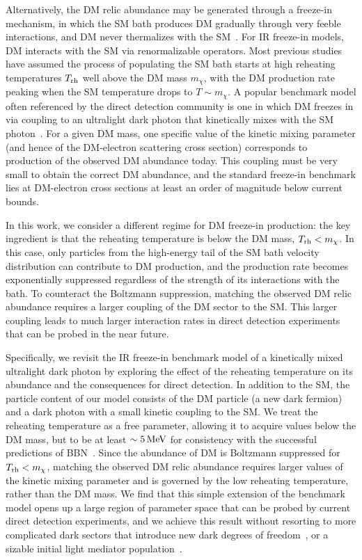 Alternatively, the DM relic abundance may be generated through a freeze-in mechanism, in which the SM bath produces DM gradually through very feeble interactions, and DM never thermalizes with the SM~\cite{Hall:2009bx}. For IR freeze-in models, DM interacts with the SM via renormalizable operators. Most previous studies have assumed the process of populating the SM bath starts at high reheating temperatures $T_{\rm rh}$ well above the DM mass $m_\chi$, with the DM production rate peaking when the SM temperature drops to $T\sim m_\chi$. A popular benchmark model often referenced by the direct detection community is one in which DM freezes in via coupling to an ultralight dark photon that kinetically mixes with the SM photon~\cite{Hall:2009bx,Chu:2011be,Essig:2011nj,Chang:2019xva}. For a given DM mass, one specific value of the kinetic mixing parameter (and hence of the DM-electron scattering cross section) corresponds to production of the observed DM abundance today. This coupling must be very small to obtain the correct DM abundance, and the standard freeze-in benchmark lies at DM-electron cross sections at least an order of magnitude below current bounds.

In this work, we consider a different regime for DM  freeze-in production: the key ingredient is that the reheating temperature is below the DM mass, $T_{\rm rh} < m_\chi$. In this case, only particles from the high-energy tail of the SM bath velocity distribution can contribute to DM production, and the production rate  becomes exponentially suppressed regardless of the strength of its interactions with the bath. To counteract the Boltzmann suppression, matching the observed DM relic abundance requires a larger coupling of the DM sector to the SM.  This larger coupling leads to much larger interaction rates in direct detection experiments that can be probed in the near future.

Specifically, we revisit the IR freeze-in benchmark model of a kinetically mixed ultralight dark photon by exploring the effect of the reheating temperature on its abundance and the consequences for direct detection. In addition to the SM, the particle content of our model consists of the DM particle (a new dark fermion) and a dark photon with a small kinetic coupling to the SM. We treat the reheating temperature as a free parameter, allowing it to acquire values below the DM mass, but to be at least $\sim 5\, {\rm MeV}$ for consistency with the successful predictions of BBN~\cite{Hasegawa:2019jsa,Kawasaki:2000en}. Since the abundance of DM is Boltzmann suppressed for $T_{\rm rh} < m_\chi$, matching the observed DM relic abundance requires larger values of the kinetic mixing parameter and is governed by the low reheating temperature, rather than the DM mass. We find that this simple extension of the benchmark model opens up a large region of parameter space that can be probed by current direct detection experiments, and we achieve this result without resorting to more complicated dark sectors that introduce new dark degrees of freedom~\cite{Bhattiprolu:2023akk}, or a sizable initial light mediator population~\cite{Fernandez:2021iti}.

